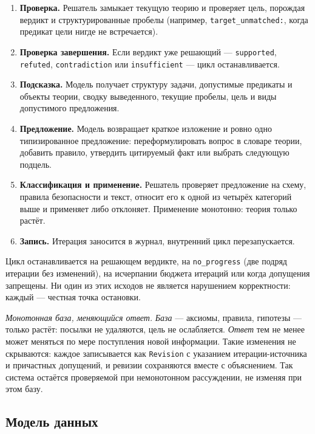 \documentclass[11pt,a4paper]{article}
\begin{document}
\begin{enumerate}
	\item \textbf{Проверка.} Решатель замыкает текущую теорию и проверяет цель, порождая вердикт и структурированные пробелы (например, \texttt{target\_unmatched:}, когда предикат цели нигде не встречается).
	\item \textbf{Проверка завершения.} Если вердикт уже решающий — \texttt{supported}, \texttt{refuted}, \texttt{contradiction} или \texttt{insufficient} — цикл останавливается.
	\item \textbf{Подсказка.} Модель получает структуру задачи, допустимые предикаты и объекты теории, сводку выведенного, текущие пробелы, цель и виды допустимого предложения.
	\item \textbf{Предложение.} Модель возвращает краткое изложение и ровно одно типизированное предложение: переформулировать вопрос в словаре теории, добавить правило, утвердить цитируемый факт или выбрать следующую подцель.
	\item \textbf{Классификация и применение.} Решатель проверяет предложение на схему, правила безопасности и текст, относит его к одной из четырёх категорий выше и применяет либо отклоняет. Применение монотонно: теория только растёт.
	\item \textbf{Запись.} Итерация заносится в журнал, внутренний цикл перезапускается.
\end{enumerate}

Цикл останавливается на решающем вердикте, на \texttt{no\_progress} (две подряд итерации без изменений), на исчерпании бюджета итераций или
когда допущения запрещены. Ни один из этих исходов не является нарушением корректности: каждый — честная точка остановки.

\emph{Монотонная база, меняющийся ответ.} \emph{База} — аксиомы, правила, гипотезы — только растёт: посылки не удаляются, цель не ослабляется.
\emph{Ответ} тем не менее может меняться по мере поступления новой информации. Такие изменения не скрываются: каждое записывается как
\texttt{Revision} с указанием итерации-источника и причастных допущений, и ревизии сохраняются вместе с объяснением. Так система остаётся
проверяемой при немонотонном рассуждении, не изменяя при этом базу.

\subsection{Модель данных}
\end{document}
